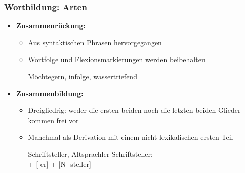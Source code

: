 \begin{frame}
\frametitle{Wortbildung: Arten}

\begin{itemize}
	\item \textbf{Zusammenrückung:}
	
	\begin{itemize}
		\item Aus syntaktischen Phrasen hervorgegangen
		\item Wortfolge und Flexionsmarkierungen werden beibehalten
		
		\ea Möchtegern, infolge, wassertriefend
		\z
		
	\end{itemize}
	
	\item \textbf{Zusammenbildung:}
	
	\begin{itemize}
		\item Dreigliedrig: weder die ersten beiden noch die letzten beiden Glieder kommen frei vor
		\item Manchmal als Derivation mit einem nicht lexikalischen ersten Teil
		
		\eal 
			\ex Schriftsteller, Altsprachler
			\ex Schriftsteller: \\ [V schriftstell-] + [-er] \vs [N Schrift-] + [N -steller]
		\zl
			 
	\end{itemize}
\end{itemize}


\end{frame}


